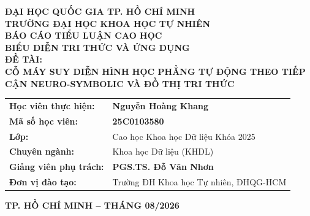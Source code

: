 \documentclass[12pt,a4paper,oneside]{report}
\begin{document}
\begin{titlepage}
\begin{center}
    \vspace*{-0.5cm}
    {\large \textbf{ĐẠI HỌC QUỐC GIA TP. HỒ CHÍ MINH}}\\[0.25cm]
    {\large \textbf{TRƯỜNG ĐẠI HỌC KHOA HỌC TỰ NHIÊN}}\\[1.2cm]

    {\large \textbf{BÁO CÁO TIỂU LUẬN CAO HỌC}}\\[0.25cm]
    {\LARGE \textbf{BIỂU DIỄN TRI THỨC VÀ ỨNG DỤNG}}\\[0.8cm]

    {\Large \textbf{ĐỀ TÀI:}}\\[0.25cm]
    {\huge \bfseries CỖ MÁY SUY DIỄN HÌNH HỌC PHẲNG TỰ ĐỘNG THEO TIẾP CẬN NEURO-SYMBOLIC VÀ ĐỒ THỊ TRI THỨC}\\[1.5cm]

    \begin{center}
    \begin{tabular}{ll}
        \textbf{Học viên thực hiện:} & \textbf{Nguyễn Hoàng Khang} \\
        \textbf{Mã số học viên:}     & \textbf{25C0103580} \\
        \textbf{Lớp:}                & Cao học Khoa học Dữ liệu Khóa 2025 \\
        \textbf{Chuyên ngành:}       & Khoa học Dữ liệu (KHDL) \\
        \textbf{Giảng viên phụ trách:} & \textbf{PGS.TS. Đỗ Văn Nhơn} \\
        \textbf{Đơn vị đào tạo:}     & Trường ĐH Khoa học Tự nhiên, ĐHQG-HCM \\
    \end{tabular}
    \end{center}

    \vfill
    {\large \textbf{TP. HỒ CHÍ MINH -- THÁNG 08/2026}}
\end{center}
\end{titlepage}



\newpage
\tableofcontents
\newpage

\newpage
\listoffigures
\newpage
\listoftables
\newpage
\end{document}
